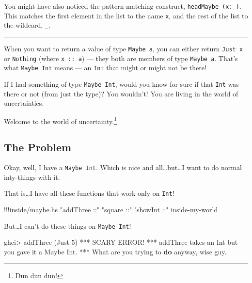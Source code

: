 \documentclass[]{article}
\newenvironment{Shaded}{}{}
\newcommand{\KeywordTok}[1]{\textcolor[rgb]{0.00,0.44,0.13}{\textbf{{#1}}}}
\newcommand{\DataTypeTok}[1]{\textcolor[rgb]{0.56,0.13,0.00}{{#1}}}
\newcommand{\DecValTok}[1]{\textcolor[rgb]{0.25,0.63,0.44}{{#1}}}
\newcommand{\StringTok}[1]{\textcolor[rgb]{0.25,0.44,0.63}{{#1}}}
\newcommand{\FunctionTok}[1]{\textcolor[rgb]{0.02,0.16,0.49}{{#1}}}
\newcommand{\NormalTok}[1]{{#1}}
\begin{document}
You might have also noticed the pattern matching construct,
\texttt{headMaybe\ (x:\_)}. This matches the first element in the list
to the name \texttt{x}, and the rest of the list to the wildcard,
\texttt{\_}.

\begin{center}\rule{0.5\linewidth}{\linethickness}\end{center}

When you want to return a value of type \texttt{Maybe\ a}, you can
either return \texttt{Just\ x} or \texttt{Nothing} (where
\texttt{x\ ::\ a}) --- they both are members of type \texttt{Maybe\ a}.
That's what \texttt{Maybe\ Int} means --- an \texttt{Int} that might or
might not be there!

If I had something of type \texttt{Maybe\ Int}, would you know for sure
if that \texttt{Int} was there or not (from just the type)? You
wouldn't! You are living in the world of uncertainties.

Welcome to the world of uncertainty.\footnote{Dun dun dun!}

\subsection{The Problem}\label{the-problem}

Okay, well, I have a \texttt{Maybe\ Int}. Which is nice and
all\ldots{}but\ldots{}I want to do normal inty-things with it.

That is\ldots{}I have all these functions that work only on
\texttt{Int}!

\begin{Shaded}
\begin{Highlighting}[]
\FunctionTok{!!!}\NormalTok{inside}\FunctionTok{/}\NormalTok{maybe}\FunctionTok{.}\NormalTok{hs }\StringTok{"addThree ::"} \StringTok{"square ::"} \StringTok{"showInt ::"} \NormalTok{inside}\FunctionTok{-}\NormalTok{my}\FunctionTok{-}\NormalTok{world}
\end{Highlighting}
\end{Shaded}

But\ldots{}I can't do these things on \texttt{Maybe\ Int}!

\begin{Shaded}
\begin{Highlighting}[]
\NormalTok{ghci}\FunctionTok{>} \NormalTok{addThree (}\DataTypeTok{Just} \DecValTok{5}\NormalTok{)}
\FunctionTok{***} \DataTypeTok{SCARY} \DataTypeTok{ERROR}\FunctionTok{!}
\FunctionTok{***} \NormalTok{addThree takes an }\DataTypeTok{Int} \NormalTok{but you gave it a }\DataTypeTok{Maybe} \DataTypeTok{Int}\FunctionTok{.}
\FunctionTok{***} \DataTypeTok{What} \NormalTok{are you trying to }\KeywordTok{do} \NormalTok{anyway, wise guy}\FunctionTok{.}
\end{Highlighting}
\end{Shaded}
\end{document}
